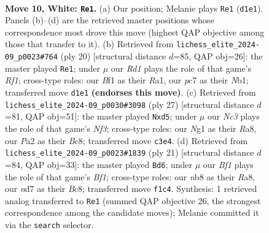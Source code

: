 \documentclass[11pt]{article}
\begin{document}
\begin{figure}[p]
\label{fig:thought-m16}
\end{figure}

\clearpage

\begin{figure}[p]\centering
\begin{subfigure}{0.46\textwidth}\centering
\resizebox{\linewidth}{!}{%
\newchessgame
\chessboard[
  setfen={rnb1r2k/pppnqppp/4p3/3pP3/3P4/2N1Q3/PPP2PPP/2KR1BNR w - - 6 10},
  showmover=false,
  pgfstyle=straightmove, color=movearrow, markmove={d1-e1}
]}
\caption{}
\end{subfigure}\hfill
\begin{subfigure}{0.46\textwidth}\centering
\resizebox{\linewidth}{!}{%
\newchessgame
\chessboard[
  setfen={r1b1k2r/pp1nqppp/2n1p3/8/2Pp4/3P1NP1/PP3PBP/RN1Q1RK1 w kq - 0 11},
  showmover=false,
  pgfstyle=straightmove, color=movearrow, markmove={f1-e1}
]}
\caption{}
\end{subfigure}
\\[4pt]
\begin{subfigure}{0.46\textwidth}\centering
\resizebox{\linewidth}{!}{%
\newchessgame
\chessboard[
  setfen={r1bq1rk1/1pp2pp1/5nnp/pP1Pp3/P7/1BPPPN1P/6P1/RN1Q1RK1 b - - 0 14},
  showmover=false,
  pgfstyle=straightmove, color=movearrow, markmove={f6-d5}
]}
\caption{}
\end{subfigure}\hfill
\begin{subfigure}{0.46\textwidth}\centering
\resizebox{\linewidth}{!}{%
\newchessgame
\chessboard[
  setfen={r1bqkbnr/pp3p2/2n5/2p3p1/3pP1Pp/3P3P/PPP1N1BB/R2QK1NR b KQkq - 1 11},
  showmover=false,
  pgfstyle=straightmove, color=movearrow, markmove={f8-d6}
]}
\caption{}
\end{subfigure}
\caption{\textbf{Move 10, White: \texttt{Re1}.} (a) Our position; Melanie plays \texttt{Re1} (\texttt{d1e1}). Panels (b)--(d) are the retrieved master positions whose correspondence most drove this move (highest QAP objective among those that transfer to it). (b) Retrieved from \texttt{lichess\_elite\_2024-09\_p0023\#764} (ply 20) [structural distance $d$=85, QAP obj=26]: the master played \texttt{Re1}; under $\mu$ our \emph{Rd1} plays the role of that game's \emph{Rf1}; cross-type roles: our \emph{B}f1 as their \emph{R}a1, our \emph{p}c7 as their \emph{N}b1; transferred move \texttt{d1e1} \textbf{(endorses this move)}. (c) Retrieved from \texttt{lichess\_elite\_2024-09\_p0030\#3098} (ply 27) [structural distance $d$=81, QAP obj=51]: the master played \texttt{Nxd5}; under $\mu$ our \emph{Nc3} plays the role of that game's \emph{Nf3}; cross-type roles: our \emph{N}g1 as their \emph{R}a8, our \emph{P}a2 as their \emph{B}c8; transferred move \texttt{c3e4}. (d) Retrieved from \texttt{lichess\_elite\_2024-09\_p0023\#1839} (ply 21) [structural distance $d$=84, QAP obj=33]: the master played \texttt{Bd6}; under $\mu$ our \emph{Bf1} plays the role of that game's \emph{Bf1}; cross-type roles: our \emph{n}b8 as their \emph{R}a8, our \emph{n}d7 as their \emph{B}c8; transferred move \texttt{f1c4}. Synthesis: 1 retrieved analog transferred to \texttt{Re1} (summed QAP objective 26, the strongest correspondence among the candidate moves); Melanie committed it via the \texttt{search} selector.}
\label{fig:thought-m18}
\end{figure}
\end{document}
